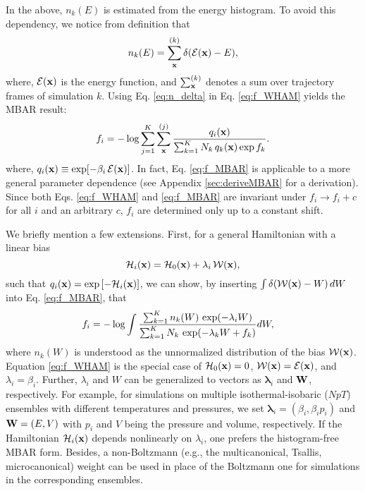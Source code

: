 \documentclass[reprint,aip,jcp,superscriptaddress]{revtex4-1}
\begin{document}
In the above,
$n_k(E)$ is estimated from the energy histogram.
%
To avoid this dependency,
we notice from definition that\cite{
souaille2001}
%
\begin{equation}
n_k(E)
=
\sum_{\mathbf{x}}^{(k)} \delta(\mathcal{E}(\mathbf{x}) - E),
\label{eq:n_delta}
\end{equation}
%
where,
$\mathcal{E}(\mathbf{x})$
is the energy function,
and
$\sum_{\mathbf{x}}^{(k)}$
denotes a sum over trajectory frames
of simulation $k$.
%
%
%
Using Eq. \eqref{eq:n_delta}
in Eq. \eqref{eq:f_WHAM} yields
the MBAR result\cite{
kumar1992, souaille2001, shirts2008}:
%
\begin{equation}
f_i
=
-\log
\sum_{j = 1}^K
\sum_{\mathbf{x}}^{(j)}
\frac{
  q_i(\mathbf{x})
}
{
  \sum_{k = 1}^K N_k \, q_k(\mathbf{x}) \exp f_k
}.
\label{eq:f_MBAR}
\end{equation}
%
where,
$q_i(\mathbf{x}) \equiv \exp[ -\beta_i \, \mathcal{E}(\mathbf{x}) ]$.
%
In fact, Eq. \eqref{eq:f_MBAR}
is applicable to a more general parameter dependence
(see Appendix \ref{sec:deriveMBAR}
for a derivation).
%
Since both Eqs. \eqref{eq:f_WHAM} and \eqref{eq:f_MBAR}
are invariant under $f_i \rightarrow f_i + c$
for all $i$ and an arbitrary $c$,
$f_i$ are determined only up to a constant shift.



We briefly mention a few extensions.
%
First,
for a general Hamiltonian
with a linear bias
\[
\mathcal{H}_i(\mathbf{x}) = \mathcal{H}_0(\mathbf{x}) + \lambda_i \, \mathcal{W}(\mathbf{x}),
\]
such that $q_i(\mathbf{x}) = \exp\left[ -\mathcal{H}_i(\mathbf{x}) \right]$,
%
we can show,
by inserting
$\int \delta(\mathcal{W}(\mathbf{x}) - W) \, dW$
into Eq. \eqref{eq:f_MBAR},
that
%
\begin{align}
f_i
&=
-\log
  \int
    \frac{
      \sum_{k = 1}^K n_k(W) \, \exp(-\lambda_i W)
    }
    {
      \sum_{k = 1}^K N_k \, \exp(-\lambda_k W + f_k)
    }
    d W,
\notag
\end{align}
%
where
$n_k(W)$
is understood as
the unnormalized distribution of
the bias $\mathcal{W}(\mathbf{x})$.
%
Equation \eqref{eq:f_WHAM}
is the special case of
$\mathcal{H}_0(\mathbf{x}) = 0$,
$\mathcal{W}(\mathbf{x}) = \mathcal{E}(\mathbf{x})$,
and $\lambda_i = \beta_i$.
%
Further,
$\lambda_i$ and $W$
can be generalized
to vectors as
$\bm{\lambda}_i$
and
$\mathbf{W}$, respectively.
%
For example,
for simulations
on multiple isothermal-isobaric ($NpT$) ensembles
with different temperatures and pressures,
%
we set
$\bm{\lambda}_i = (\beta_i, \beta_i p_i)$
and
$\mathbf{W} = (E, V)$
with
$p_i$ and $V$
being the pressure and volume,
respectively.
%
If the Hamiltonian $\mathcal{H}_i(\mathbf{x})$
depends nonlinearly on $\lambda_i$,
one prefers the histogram-free MBAR form\cite{
shirts2008}.
%
Besides,
a non-Boltzmann
(e.g., the multicanonical\cite{
mezei1987, *berg1992, *lee1993},
Tsallis\cite{tsallis1988},
microcanonical\cite{
yan2003, *martin-mayor2007, *zhang2013})
weight
can be used in place of the Boltzmann one
for simulations in the corresponding ensembles.
%
\end{document}
